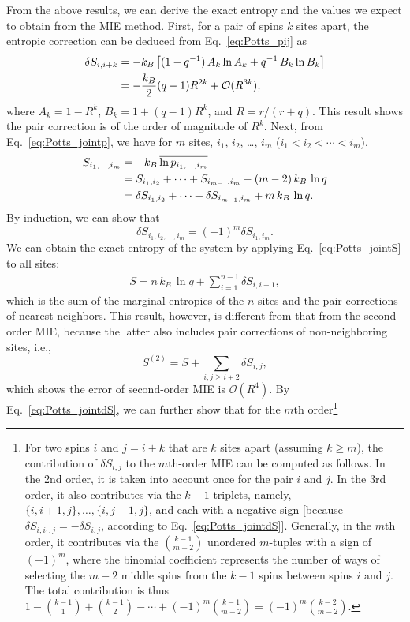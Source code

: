 \documentclass[reprint, superscriptaddress]{revtex4-1}
\begin{document}
From the above results, we can derive the exact entropy
and the values we expect to obtain from the MIE method.
%
First, for a pair of spins $k$ sites apart,
the entropic correction can be deduced from Eq.~\eqref{eq:Potts_pij} as
\begin{align}
  \delta S_{i, i+k}
  &=
  -k_B \left[
    (1 - q^{-1}) \, A_k \ln A_k
  + q^{-1} \, B_k \ln B_k \right]
  \notag\\
  &=
  -\frac{k_B}{2} (q-1) R^{2k}
  +\mathcal{O}(R^{3k})
 ,
\end{align}
where
$A_k = 1 - R^k$,
$B_k = 1 + (q-1) R^k$,
and $R = r/(r+q)$.
%
This result shows the pair correction is of the order of magnitude of $R^k$.
%
Next, from Eq.~\eqref{eq:Potts_jointp},
we have for $m$ sites,
$i_1$, $i_2$, \dots, $i_m$ ($i_1 < i_2 < \cdots < i_m$),
\begin{align}
S_{i_1, \dots, i_m}
  &= - k_B \, \overline{\ln p_{i_1,\dots, i_m}}
  \notag\\
  &= S_{i_1,i_2} + \cdots + S_{i_{m-1},i_m} - (m-2) \, k_B \, \ln q
  \notag\\
  &= \delta S_{i_1,i_2} + \cdots + \delta S_{i_{m-1},i_m} + m \, k_B \, \ln q
  .
  \label{eq:Potts_jointS}
\end{align}
%
By induction, we can show that
%
\begin{equation}
  \delta S_{i_1, i_2, \dots, i_m} = (-1)^m \delta S_{i_1, i_m}.
  \label{eq:Potts_jointdS}
\end{equation}
%
We can obtain the exact entropy of the system
by applying Eq.~\eqref{eq:Potts_jointS} to all sites:
\begin{align*}
  S =
  n \, k_B \, \ln q
  + \sum_{i=1}^{n-1} \delta S_{i,i+1}
  ,
\end{align*}
which is the sum of the marginal entropies of the $n$ sites
and the pair corrections of nearest neighbors.
%
This result, however, is different from that from the second-order MIE,
because the latter also includes pair corrections
of non-neighboring sites, i.e.,
$$
S^{(2)} = S + \sum_{i, j \ge i+2} \delta S_{i, j}
,
$$
which shows the error of second-order MIE is $\mathcal O(R^4)$.
By Eq.~\eqref{eq:Potts_jointdS}, we can further show that
for the $m$th order\footnote{
  For two spins $i$ and $j = i + k$ that are $k$ sites apart (assuming $k \ge m$),
  the contribution of $\delta S_{i, j}$ to the $m$th-order MIE
  can be computed as follows.
  In the 2nd order, it is taken into account once for the pair $i$ and $j$.
  In the 3rd order, it also contributes via the $k-1$ triplets, namely,
  $\{i, i+1, j\}, \dots, \{i, j-1, j\}$,
  and each with a negative sign [because $\delta S_{i,i_1,j} = -\delta S_{i,j}$,
  according to Eq.~\eqref{eq:Potts_jointdS}].
  Generally, in the $m$th order,
  it contributes via the ${k-1 \choose m-2}$ unordered $m$-tuples
  with a sign of $(-1)^m$,
  where the binomial coefficient represents the number of ways
  of selecting the $m-2$ middle spins from the $k-1$ spins
  between spins $i$ and $j$.
  The total contribution is thus
  $1 - {k-1 \choose 1} + {k-1 \choose 2} - \cdots + (-1)^{m}{k-1 \choose m-2}
  = (-1)^m {k-2 \choose m-2}$.
}
\end{document}
